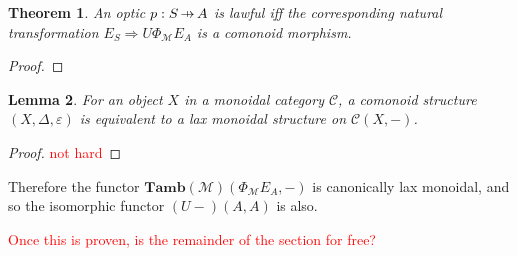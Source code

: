 \documentclass[11pt,a4paper]{article}
\theoremstyle{plain}
\newtheorem{theorem}{Theorem}[subsection]
\newtheorem{lemma}[theorem]{Lemma}
\theoremstyle{definition}
\newcommand{\C}{\mathscr{C}}
\newcommand{\M}{\mathscr{M}}
\newcommand{\Pastro}{\Phi}
\newcommand{\Tamb}{\mathbf{Tamb}}
\newcommand{\hto}{\ensuremath{\,\mathaccent\shortmid\rightarrow\,}}
\newcommand{\todo}[1]{\textcolor{red}{\small #1}}
\begin{document}
\begin{theorem}
An optic $p : S \hto A$ is lawful iff the corresponding natural transformation $E_S \Rightarrow U \Phi_\M E_A$ is a comonoid morphism.
\end{theorem}
\begin{proof}

\end{proof}

\begin{lemma}
For an object $X$ in a monoidal category $\C$, a comonoid structure $(X,\Delta,\varepsilon)$ is equivalent to a lax monoidal structure on $\C(X, -)$.
\end{lemma}
\begin{proof}
\todo{not hard}
\end{proof}

Therefore the functor $\Tamb(\M)(\Pastro_\M E_A, -)$ is canonically lax monoidal, and so the isomorphic functor $(U-)(A,A)$ is also.

\todo{Once this is proven, is the remainder of the section for free?}
\end{document}
